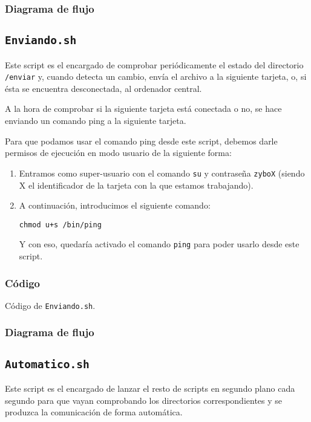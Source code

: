 \documentclass[12pt,letterpaper]{article}
\begin{document}
\subsubsection{Diagrama de flujo}


\subsection{\texttt{Enviando.sh}}
Este script es el encargado de comprobar periódicamente el estado del directorio \texttt{/enviar} y, cuando detecta un cambio, envía el archivo a la siguiente tarjeta, o, si ésta se encuentra desconectada, al ordenador central.

A la hora de comprobar si la siguiente tarjeta está conectada o no, se hace enviando un comando ping a la siguiente tarjeta.

Para que podamos usar el comando ping desde este script, debemos darle permisos de ejecución en modo usuario de la siguiente forma:
\begin{enumerate}
	\item Entramos como super-usuario con el comando \texttt{su} y contraseña \texttt{zyboX} (siendo X el identificador de la tarjeta con la que estamos trabajando).
	\item A continuación, introducimos el siguiente comando:
	\begin{center}
		\texttt{chmod u+s /bin/ping}
	\end{center}
	Y con eso, quedaría activado el comando \texttt{ping} para poder usarlo desde este script.
\end{enumerate}

\subsubsection{Código}

\begin{center}
	Código de \texttt{Enviando.sh}.
\end{center}

\subsubsection{Diagrama de flujo}


\subsection{\texttt{Automatico.sh}}
Este script es el encargado de lanzar el resto de scripts en segundo plano cada segundo para que vayan comprobando los directorios correspondientes y se produzca la comunicación de forma automática.
\end{document}
